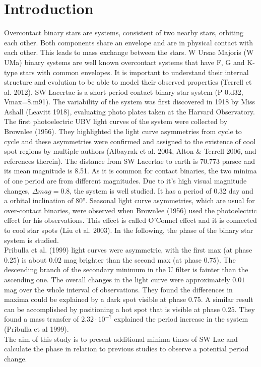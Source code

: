 \section{Introduction}
\label{sec:Theorie}

Overcontact binary stars are systems, consistent of two nearby stars, orbiting each other.
Both components share an envelope and 
are in physical contact with each other. This leads to mass exchange 
between the stars. W Ursae Majoris (W UMa) binary systems are well known overcontact 
systems that have F, G and K-type stars with common envelopes. It is important to 
understand their internal structure and evolution to be able to model their observed 
properties (Terrell et al. 2012). SW Lacertae is a short-period contact binary star 
system (P 0.d32, Vmax=8.m91). The variability of the system was first discovered in 
1918 by Miss Ashall (Leavitt 1918), evaluating photo plates taken at the Harvard Observatory. 
The first photoelectric 
UBV light curves of the system were collected by Brownlee (1956). They highlighted the 
light curve asymmetries from cycle to cycle and these asymmetries were confirmed and 
assigned to the existence of cool spot regions by multiple authors (Albayrak et al. 
2004, Alton \& Terrell 2006, and references therein). The distance from SW Lacertae to 
earth is 70.773 parsec and its mean magnitude is 8.51. As it is common for contact 
binaries, the two minima of one period are from different magnitudes. Due to it’s 
high visual magnitude changes, $\Delta mag = 0.8$, the system is well studied. It has a 
period of 0.32 day and a orbital inclination of 80°. Seasonal light curve asymmetries,
 which are usual for over-contact binaries, were observed when Brownlee (1956) used the
  photoelectric effect for his observations. This effect is called O’Connel effect and 
  it is connected to cool star spots (Liu et al. 2003). 
In the following, the phase of the binary star system is studied.\\
\noindent Pribulla et al. (1999) light curves were asymmetric, with the first max (at phase $0.25$) is about 
$0.02$ mag brighter than the second max (at phase $0.75$). The descending branch of the 
secondary minimum in the U filter is fainter than the ascending one. The overall changes 
in the light curve were approximately $0.01$ mag over the whole interval of observations. 
They found the differences in maxima could be explained by a dark spot visible at phase $0.75$.
 A similar result can be accomplished by positioning a hot spot that is visible at phase $0.25$.
  They found a mass transfer of $2.32 \cdot 10^{-7}$ explained the period increase in the system 
  (Pribulla et al 1999).\\
\noindent The aim of this study is to present additional minima times of SW Lac and calculate the phase in 
relation to previous studies to observe a potential period change. 
